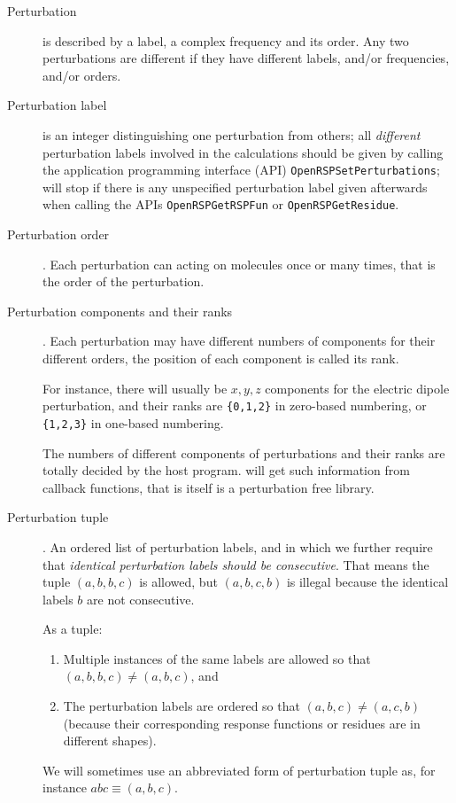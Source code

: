 \begin{description}
  \item[Perturbation] is described by a label, a complex frequency and its
    order. Any two perturbations are different if they have different labels,
    and/or frequencies, and/or orders.
  \item[Perturbation label] is an integer distinguishing one perturbation
    from others; all \textit{different} perturbation labels involved in the
    calculations should be given by calling the application programming interface
    (API) \texttt{OpenRSPSetPerturbations}; \LibName will stop if there is any
    unspecified perturbation label given afterwards when calling the APIs
    \texttt{OpenRSPGetRSPFun} or \texttt{OpenRSPGetResidue}.
  \item[Perturbation order]. Each perturbation can acting on molecules once
    or many times, that is the order of the perturbation.
  \item[Perturbation components and their ranks]. Each perturbation may have
    different numbers of components for their different orders, the position of
    each component is called its rank.

    For instance, there will usually be $x,y,z$ components for the
    electric dipole perturbation, and their ranks are \texttt{\{0,1,2\}} in
    zero-based numbering, or \texttt{\{1,2,3\}} in one-based numbering.
  
    The numbers of different components of perturbations and their ranks
    are totally decided by the host program. \LibName will get such information
    from callback functions, that is \LibName itself is a perturbation free
    library.
  \item[Perturbation tuple]. An ordered list of perturbation labels, and in
    which we further require that \textit{identical perturbation labels should
    be consecutive}. That means the tuple $(a,b,b,c)$ is allowed, but $(a,b,c,b)$
    is illegal because the identical labels $b$ are not consecutive.

    As a tuple:
    \begin{enumerate}
      \item Multiple instances of the same labels are allowed so that
        $(a,b,b,c)\ne(a,b,c)$, and
      \item The perturbation labels are ordered so that $(a,b,c)\ne(a,c,b)$
        (because their corresponding response functions or residues are in
        different shapes).
    \end{enumerate}
    We will sometimes use an abbreviated form of perturbation tuple as,
    for instance $abc\equiv(a,b,c)$.


\end{description}
